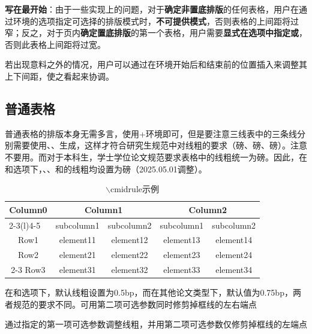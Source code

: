 \documentclass[doctor, vlined, ]{DissertUESTC}
\begin{document}
	\textbf{写在最开始}：由于一些实现上的问题，对于\textbf{确定非置底排版}的任何表格，用户在通过环境的选项指定可选择的排版模式时，\textbf{\color{DarkRed}不可提供模式}，否则表格的上间距将过窄；反之，对于页内\textbf{确定置底排版}的第一个表格，用户需要\textbf{\color{DarkRed}显式在选项中指定或}，否则此表格上间距将过宽。

	若出现意料之外的情况，用户可以通过在环境开始后和结束前的位置插入来调整其上下间距，使之看起来协调。
	
	\subsection{普通表格}
	
	普通表格的排版本身无需多言，使用+环境即可，但是要注意三线表中的三条线分别需要使用、、生成，这样才符合研究生规范中对线粗的要求（磅、磅、磅）。注意不要用。而对于本科生，学士学位论文规范要求表格中的线粗统一为磅。因此，在和选项下，、、和的线粗均设置为磅（2025.05.01调整）。
	
	\begin{table}[htp]
		\caption{$\backslash$cmidrule示例}\label{tab: cmidrule示例}
		\begin{threeparttable}
			\begin{tabular}{ccccc}
				\toprule
				\multirow{2}{*}{Column0} &  \multicolumn{2}{c}{Column1\tnote{1}} & \multicolumn{2}{c}{Column2\tnote{2}} \\
				\cmidrule(lr){2-3}\cmidrule[2.5bp](l){4-5}
				~     & subcolumn1 & subcolumn2 & subcolumn1 & subcolumn2 \\
				\midrule
				Row1  & element11 & element12 &element13 & element14 \\
				Row2  & element21 & element22 &element23 & element24 \\
				\cmidrule{2-3}\cmidrule[2.5bp]{4-5}
				Row3  & element31 & element32 &element33 & element34 \\
				\bottomrule
			\end{tabular}
			\begin{tablenotes}
				\item[1] 在和选项下，默认线粗设置为0.5bp，而在其他论文类型下，默认值为0.75bp，两者规范的要求不同。可用第二项可选参数同时修剪掉框线的左右端点
				\item[2] 通过指定的第一项可选参数调整线粗，并用第二项可选参数仅修剪掉框线的左端点
			\end{tablenotes}
		\end{threeparttable}
	\end{table}
\end{document}
